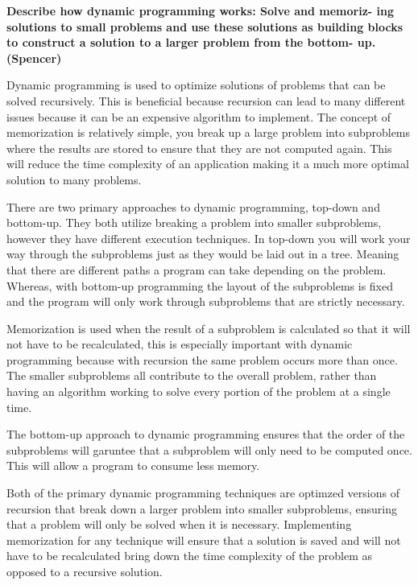 \documentclass{article}
\begin{document}
\bigskip

\noindent \textbf{Describe how dynamic programming works: Solve and memoriz-
ing solutions to small problems and use these solutions as building
blocks to construct a solution to a larger problem from the bottom-
up. (Spencer)} 

\medskip

Dynamic programming is used to optimize solutions of problems that can be solved recursively.
This is beneficial because recursion can lead to many different issues because it can be an 
expensive algorithm to implement. The concept of memorization is relatively simple, you break up a large problem
into subproblems where the results are stored to ensure that they are not computed again.
This will reduce the time complexity of an application making it a much more optimal solution
to many problems.

There are two primary approaches to dynamic programming, top-down and bottom-up. They both utilize
breaking a problem into smaller subproblems, however they have different execution techniques.
In top-down you will work your way through the subproblems just as they would be laid out in a tree.
Meaning that there are different paths a program can take depending on the problem. Whereas, with
bottom-up programming the layout of the subproblems is fixed and the program will only work through
subproblems that are strictly necessary.

Memorization is used when the result of a subproblem is calculated so that it will not have
to be recalculated, this is especially important with dynamic programming because with recursion
the same problem occurs more than once. The smaller subproblems all contribute to the overall 
problem, rather than having an algorithm working to solve every portion of the problem at a 
single time.

The bottom-up approach to dynamic programming ensures that the order of the subproblems will
garuntee that a subproblem will only need to be computed once. This will allow a program to
consume less memory. 

Both of the primary dynamic programming techniques are optimzed versions of recursion that
break down a larger problem into smaller subproblems, ensuring that a problem will only be solved
when it is necessary. Implementing memorization for any technique will ensure that a solution is
saved and will not have to be recalculated bring down the time complexity of the problem as
opposed to a recursive solution.
\end{document}
